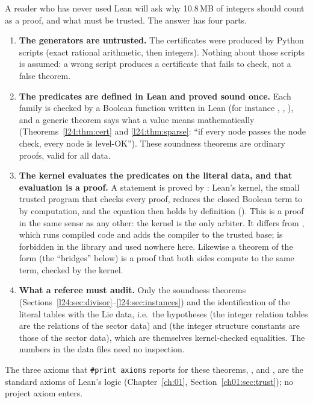 A reader who has never used Lean will ask why 10.8\,MB of integers should count as a proof, and what must be trusted.
The answer has four parts.
\begin{enumerate}
\item \textbf{The generators are untrusted.} The certificates were produced by Python scripts (exact rational
  arithmetic, then integers). Nothing about those scripts is assumed: a wrong script produces a certificate that fails to
  check, not a false theorem.
\item \textbf{The predicates are defined in Lean and proved sound once.} Each family is checked by a Boolean function
  written in Lean (for instance , , ), and a generic theorem says what a
   value means mathematically (Theorems~\ref{l24:thm:cert} and \ref{l24:thm:sparse}: ``if every node passes the
  node check, every node is level-OK''). These soundness theorems are ordinary proofs, valid for all data.
\item \textbf{The kernel evaluates the predicates on the literal data, and that evaluation is a proof.} A statement
   is proved by : Lean's kernel, the small trusted program that checks
  every proof, reduces the closed Boolean term to  by computation, and the equation then holds by definition
  (). This is a proof in the same sense as any other: the kernel is the only arbiter. It differs from
  , which runs compiled code and adds the compiler to the trusted base;  is
  forbidden in the library and used nowhere here. Likewise a theorem of the form  (the ``bridges'' below)
  is a proof that both sides compute to the same term, checked by the kernel.
\item \textbf{What a referee must audit.} Only the soundness theorems (Sections~\ref{l24:sec:divisor}--\ref{l24:sec:instances})
  and the identification of the literal tables with the Lie data, i.e.\ the hypotheses  (the integer relation
  tables are the relations of the sector data) and  (the integer structure constants are those of the sector
  data), which are themselves kernel-checked equalities. The numbers in the data files need no inspection.
\end{enumerate}
The three axioms that \texttt{\#print axioms} reports for these theorems, ,  and
, are the standard axioms of Lean's logic (Chapter~\ref{ch:01}, Section~\ref{ch01:sec:trust}); no project
axiom enters.

